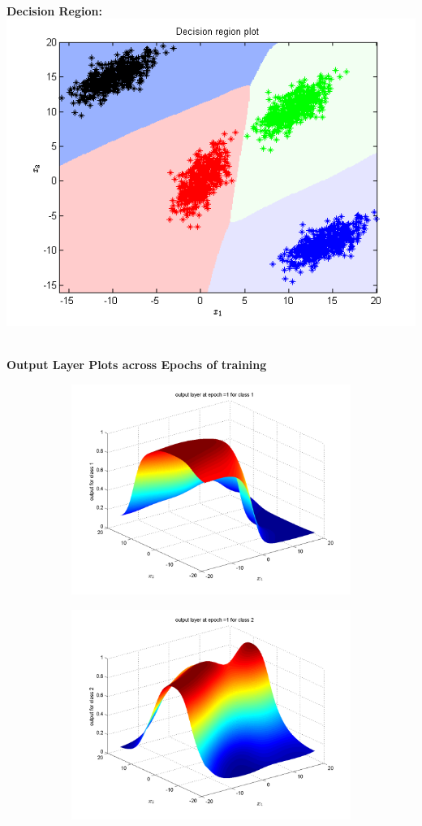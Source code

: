 \documentclass{article}
\begin{document}
\begin{flushleft}
\textbf{\\[10pt]Decision Region:\\[5pt]}
\includegraphics[scale=1]{Classification/linearlySeparable/decn_region_nn}

\textbf{\\[10pt]Output Layer Plots across Epochs of training}
\begin{figure}
\begin{subfigure}{.5\textwidth}
  \centering
  \includegraphics[width=.8\linewidth]{Classification/linearlySeparable/1_1}
 
\end{subfigure}%
\begin{subfigure}{.5\textwidth}
  \centering
  \includegraphics[width=.8\linewidth]{Classification/linearlySeparable/1_2}
  

\end{subfigure}
\end{figure}
\end{flushleft}
\end{document}
